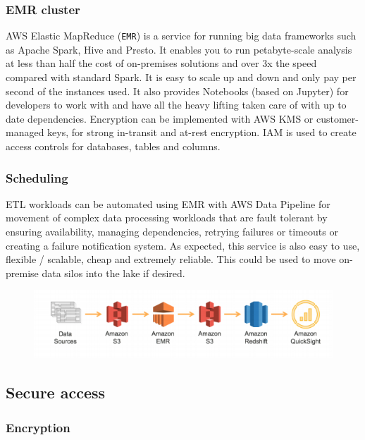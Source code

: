 \documentclass[10pt]{article}
\begin{document}
\subsubsection{EMR cluster}
AWS Elastic MapReduce (\texttt{EMR}) is a service for running big data frameworks such as Apache Spark, Hive and Presto. It enables you to run petabyte-scale analysis at less than half the cost of on-premises solutions and over 3x the speed compared with standard Spark. It is easy to scale up and down and only pay per second of the instances used. It also provides Notebooks (based on Jupyter) for developers to work with and have all the heavy lifting taken care of with up to date dependencies. Encryption can be implemented with AWS KMS or customer-managed keys, for strong in-transit and at-rest encryption. IAM is used to create access controls for databases, tables and columns. \cite{aws-emr}
\subsubsection{Scheduling}
ETL workloads can be automated using EMR with AWS Data Pipeline for movement of complex data processing workloads that are fault tolerant by ensuring availability, managing dependencies, retrying failures or timeouts or creating a failure notification system. As expected, this service is also easy to use, flexible / scalable, cheap and extremely reliable. This could be used to move on-premise data silos into the lake if desired.
\begin{figure}[h!]
	\centering
	\includegraphics[width=0.8\linewidth]{images/AWSWorkflow.png}
	\cite{aws-warehousing}
\end{figure}

\subsection{Secure access}
\label{sec:secure_access}

\subsubsection{Encryption}
\end{document}
